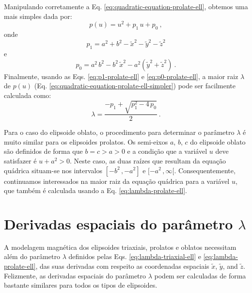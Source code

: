 Manipulando corretamente a Eq. \ref{eq:quadratic-equation-prolate-ell}, obtemos uma mais simples dada por:
\begin{equation}
p(u) =  u^{2} + p_{1} \, u + p_{0} \: ,
\label{eq:quadratic-equation-prolate-ell-simpler}
\end{equation}
onde
\begin{equation}
p_{1} = a^{2} + b^{2} - \tilde{x}^{2} - \tilde{y}^{2} - \tilde{z}^{2}
\label{eq:p1-prolate-ell}
\end{equation}
e
\begin{equation}
p_{0} =  a^{2} \, b^{2} 
- b^{2} \, \tilde{x}^{2} 
- a^{2} \left( \tilde{y}^{2} + \tilde{z}^{2} \right) \: .
\label{eq:p0-prolate-ell}
\end{equation}
Finalmente, usando as Eqs. \ref{eq:p1-prolate-ell} e
\ref{eq:p0-prolate-ell}, a maior raiz $\lambda$ de $p(u)$ 
(Eq. \ref{eq:quadratic-equation-prolate-ell-simpler}) pode ser 
facilmente calculada como:
\begin{equation}
\lambda = \frac{-p_{1} + \sqrt{p_{1}^{2} - 4 \, p_{0}}}{2} \: .
\label{eq:lambda-prolate-ell}
\end{equation}

Para o caso do elipsoide oblato, o procedimento para determinar o parâmetro
$\lambda$ é muito similar para os elipsoides prolatos. Os semi-eixos $a$, $b$, $c$
do elipsoide oblato são definidos de forma que $b = c > a > 0$ e a condição que a variável $u$
deve satisfazer é $u + a^{2} > 0$. Neste caso, as duas raízes que resultam da equação quádrica situam-se
nos intervalos $[ -b^{2} \, , -a^{2} ]$ e $[ -a^{2} \, , \infty [$. Consequentemente, continuamos interessados 
na maior raiz da equação quádrica para a variável $u$, que também é calculada usando a Eq. \ref{eq:lambda-prolate-ell}.

\section{Derivadas espaciais do parâmetro $\lambda$}

A modelagem magnética dos elipsoides triaxiais, prolatos e oblatos necessitam além do parâmetro
$\lambda$ definidos pelas Eqs. \ref{eq:lambda-triaxial-ell} e \ref{eq:lambda-prolate-ell}, das suas derivadas
com respeito as coordenadas espaciais $\tilde{x}$, $\tilde{y}$, and $\tilde{z}$.
Felizmente, as derivadas espaciais do parâmetro $\lambda$ podem ser calculadas de forma bastante
similares para todos os tipos de elipsoides.

